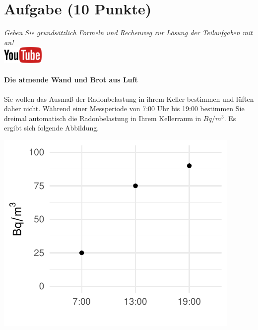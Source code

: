 \documentclass[a4paper, 10pt]{scrartcl}\usepackage[]{graphicx}\usepackage[]{xcolor}
\makeatletter
\def\maxwidth{ %
  \ifdim\Gin@nat@width>\linewidth
    \linewidth
  \else
    \Gin@nat@width
  \fi
}
\newenvironment{knitrout}{}{} %
\makeatother
\begin{document}
 
\clearpage

\section{Aufgabe \hfill (10 Punkte)}

\textit{Geben Sie grunds{\"a}tzlich Formeln und Rechenweg zur L{\"o}sung der
  Teilaufgaben mit an!} \\[1Ex]

\hfill\href{https://youtu.be/4-dSaPMhK9s}{\includegraphics[width =
  2cm]{img/youtube}} %
\hspace{2Ex}

\paragraph{Die atmende Wand und Brot aus Luft}



Sie wollen das Ausma{\ss} der Radonbelastung in ihrem Keller bestimmen und
l{\"u}ften daher nicht. W{\"a}hrend einer Messperiode von 7:00 Uhr bis
19:00 bestimmen Sie dreimal automatisch die Radonbelastung in
Ihrem Kellerraum in $Bq/m^3$. Es ergibt sich folgende Abbildung.

\begin{knitrout}
\color{fgcolor}

{\centering \includegraphics[width=\maxwidth]{img/math-10-1} 

}


\end{knitrout}
\end{document}
